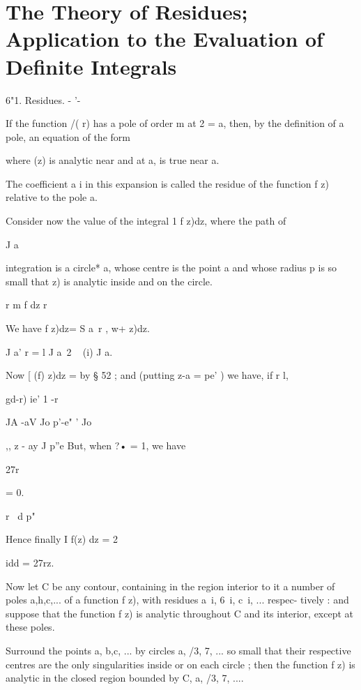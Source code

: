 \chapter{The Theory of Residues; Application to the Evaluation of Definite Integrals} 

6"1. Residues. - '-

If the function /( r) has a pole of order m at 2 = a, then, by the
definition of a pole, an equation of the form

where (z) is analytic near and at a, is true near a.

The coefficient a i in this expansion is called the residue of the
function f z) relative to the pole a.

Consider now the value of the integral 1 f z)dz, where the path of

J a

integration is a circle* a, whose centre is the point a and whose
radius p is so small that z) is analytic inside and on the circle.

r m f dz r

We have f z)dz= S a\ r , w+ z)dz.

J a' r = l J a\ 2 ~ (i) J a.

Now [ (f) z)dz = by § 52 ; and (putting z-a = pe' ) we have, if r l,

gd-r) ie' 1 -r



JA -aV Jo p'-e" ' Jo



,, z - ay J p''e But, when ?• = 1, we have



27r

= 0.





r \ d p"

Hence finally I f(z) dz = 2



idd = 27rz.



Now let C be any contour, containing in the region interior to it a
number of poles a,h,c,... of a function f z), with residues a\ i, 6\
i, c\ i, ... respec- tively : and suppose that the function f z) is
analytic throughout C and its interior, except at these poles.

Surround the points a, b,c, ... by circles a, /3, 7, ... so small that
their respective centres are the only singularities inside or on each
circle ; then the function f z) is analytic in the closed region
bounded by C, a, /3, 7, ....


